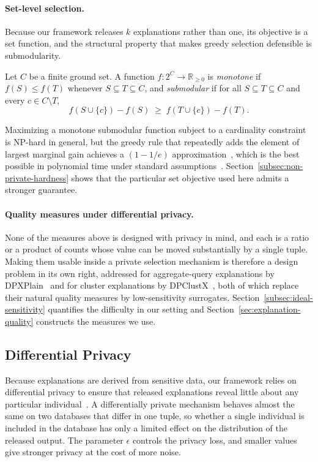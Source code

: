 \paragraph{Set-level selection.}
Because our framework releases $k$ explanations rather than one, its objective is a
set function, and the structural property that makes greedy selection defensible is
submodularity.

\begin{definition}
\label{def:submodular}
Let $C$ be a finite ground set. A function $f:2^{C}\rightarrow\mathbb{R}_{\ge 0}$ is
\emph{monotone} if $f(S)\le f(T)$ whenever $S\subseteq T\subseteq C$, and
\emph{submodular} if for all $S\subseteq T\subseteq C$ and every $c\in C\setminus T$,
\[
f(S\cup\{c\})-f(S) \;\ge\; f(T\cup\{c\})-f(T).
\]
\end{definition}

Maximizing a monotone submodular function subject to a cardinality constraint is
NP-hard in general, but the greedy rule that repeatedly adds the element of largest
marginal gain achieves a $(1-1/e)$ approximation~\cite{NemhauserWF78}, which is the
best possible in polynomial time under standard
assumptions~\cite{Feige98}.
Section~\ref{subsec:non-private-hardness} shows that the particular set objective
used here admits a stronger guarantee.

\paragraph{Quality measures under differential privacy.}
None of the measures above is designed with privacy in mind, and each is a ratio or
a product of counts whose value can be moved substantially by a single tuple.
Making them usable inside a private selection mechanism is therefore a design
problem in its own right, addressed for aggregate-query explanations by
DPXPlain~\cite{TaoGMR22} and for cluster explanations by
DPClustX~\cite{DPClustX}, both of which replace their natural quality measures by
low-sensitivity surrogates.
Section~\ref{subsec:ideal-sensitivity} quantifies the difficulty in our setting and
Section~\ref{sec:explanation-quality} constructs the measures we use.

\subsection{Differential Privacy}
\label{subsec:prelim-dp}
Because explanations are derived from sensitive data, our framework relies on
differential privacy to ensure that released explanations reveal little about any
particular individual~\cite{TheAlgFoundDP2014}. A differentially private mechanism
behaves almost the same on two databases that differ in one tuple, so whether a
single individual is included in the database has only a limited effect on the
distribution of the released output. The parameter $\epsilon$ controls the privacy
loss, and smaller values give stronger privacy at the cost of more noise.

